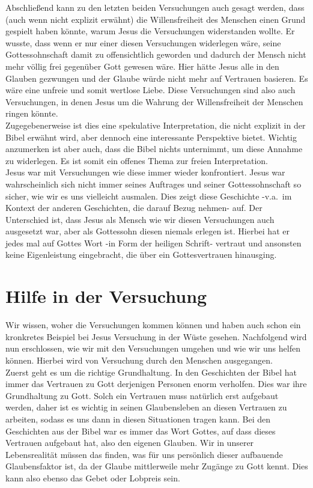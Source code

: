 Abschließend kann zu den letzten beiden Versuchungen auch gesagt werden, dass (auch wenn nicht explizit erwähnt) die Willensfreiheit des Menschen einen Grund gespielt haben könnte, warum Jesus die Versuchungen widerstanden wollte. Er wusste, dass wenn er nur einer diesen Versuchungen widerlegen wäre, seine Gottessohnschaft damit zu offensichtlich geworden und dadurch der Mensch nicht mehr völlig frei gegenüber Gott gewesen wäre. Hier hätte Jesus alle in den Glauben gezwungen und der Glaube würde nicht mehr auf Vertrauen basieren. Es wäre eine unfreie und somit wertlose Liebe. Diese Versuchungen sind also auch Versuchungen, in denen Jesus um die Wahrung der Willensfreiheit der Menschen ringen könnte. \\
Zugegebenerweise ist dies eine spekulative Interpretation, die nicht explizit in der Bibel erwähnt wird, aber dennoch eine interessante Perspektive bietet. Wichtig anzumerken ist aber auch, dass die Bibel nichts unternimmt, um diese Annahme zu widerlegen. Es ist somit ein offenes Thema zur freien Interpretation.\\

Jesus war mit Versuchungen wie diese immer wieder konfrontiert. Jesus war wahrscheinlich sich nicht immer seines
Auftrages und seiner Gottessohnschaft so sicher, wie wir es uns vielleicht ausmalen. Dies zeigt diese Geschichte -v.a.\ im Kontext der anderen Geschichten, die darauf Bezug nehmen- auf. Der Unterschied ist, dass Jesus als Mensch wie wir
diesen Versuchungen auch ausgesetzt war, aber als Gottessohn diesen niemals erlegen ist. Hierbei hat er jedes mal auf
Gottes Wort -in Form der heiligen Schrift- vertraut und ansonsten keine Eigenleistung eingebracht, die über ein
Gottesvertrauen hinausging.

\section{Hilfe in der Versuchung}
Wir wissen, woher die Versuchungen kommen können und haben auch schon ein kronkretes Beispiel bei Jesus Versuchung in
der Wüste gesehen. Nachfolgend wird nun erschlossen, wie wir mit den Versuchungen umgehen und wie wir uns helfen
können. Hierbei wird von Versuchung durch den Menschen ausgegangen. \\

Zuerst geht es um die richtige Grundhaltung. In den Geschichten der Bibel hat immer das Vertrauen zu Gott derjenigen
Personen enorm verholfen. Dies war ihre Grundhaltung zu Gott. Solch ein Vertrauen muss natürlich erst aufgebaut werden,
daher ist es wichtig in seinen Glaubensleben an diesen Vertrauen zu arbeiten, sodass es uns dann in diesen Situationen
tragen kann. Bei den Geschichten aus der Bibel war es immer das Wort Gottes, auf dass dieses Vertrauen aufgebaut hat,
also den eigenen Glauben. Wir in unserer Lebensrealität müssen das finden, was für uns persönlich dieser aufbauende
Glaubensfaktor ist, da der Glaube mittlerweile mehr Zugänge zu Gott kennt. Dies kann also ebenso das Gebet oder
Lobpreis sein. \\

